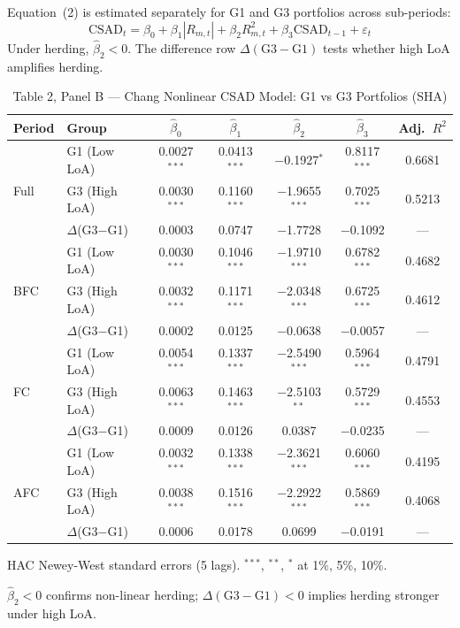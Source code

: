 \documentclass[12pt, a4paper]{article}
\newcommand{\CSAD}{\mathrm{CSAD}}
\begin{document}
Equation~(2) is estimated separately for G1 and G3 portfolios across sub-periods:
\begin{equation}
  \CSAD_t = \beta_0 + \beta_1 |R_{m,t}| + \beta_2 R_{m,t}^2 + \beta_3 \CSAD_{t-1} + \varepsilon_t
\end{equation}
Under herding, $\hat\beta_2 < 0$. The difference row $\Delta(\text{G3}-\text{G1})$ tests whether high LoA amplifies herding.

\begin{table}[H]
  \centering
  \caption{Table 2, Panel B — Chang Nonlinear CSAD Model: G1 vs G3 Portfolios (SHA)}
  \label{tab:chang_panel_b}
  \begin{threeparttable}
  \small
  \begin{tabular}{llccccc}
    \toprule
    Period & Group & $\hat\beta_0$ & $\hat\beta_1$ & $\hat\beta_2$ & $\hat\beta_3$ & Adj.~$R^2$ \\
    \midrule
    \multirow{3}{*}{Full}
      & G1 (Low LoA)  & 0.0027$^{***}$ &  0.0413$^{***}$ & $-$0.1927$^{*}$   & 0.8117$^{***}$ & 0.6681 \\
      & G3 (High LoA) & 0.0030$^{***}$ &  0.1160$^{***}$ & $-$1.9655$^{***}$ & 0.7025$^{***}$ & 0.5213 \\
      & $\Delta$(G3$-$G1) & 0.0003 & 0.0747 & $-$1.7728 & $-$0.1092 & --- \\
    \midrule
    \multirow{3}{*}{BFC}
      & G1 (Low LoA)  & 0.0030$^{***}$ &  0.1046$^{***}$ & $-$1.9710$^{***}$ & 0.6782$^{***}$ & 0.4682 \\
      & G3 (High LoA) & 0.0032$^{***}$ &  0.1171$^{***}$ & $-$2.0348$^{***}$ & 0.6725$^{***}$ & 0.4612 \\
      & $\Delta$(G3$-$G1) & 0.0002 & 0.0125 & $-$0.0638 & $-$0.0057 & --- \\
    \midrule
    \multirow{3}{*}{FC}
      & G1 (Low LoA)  & 0.0054$^{***}$ &  0.1337$^{***}$ & $-$2.5490$^{***}$ & 0.5964$^{***}$ & 0.4791 \\
      & G3 (High LoA) & 0.0063$^{***}$ &  0.1463$^{***}$ & $-$2.5103$^{**}$  & 0.5729$^{***}$ & 0.4553 \\
      & $\Delta$(G3$-$G1) & 0.0009 & 0.0126 &  0.0387 & $-$0.0235 & --- \\
    \midrule
    \multirow{3}{*}{AFC}
      & G1 (Low LoA)  & 0.0032$^{***}$ &  0.1338$^{***}$ & $-$2.3621$^{***}$ & 0.6060$^{***}$ & 0.4195 \\
      & G3 (High LoA) & 0.0038$^{***}$ &  0.1516$^{***}$ & $-$2.2922$^{***}$ & 0.5869$^{***}$ & 0.4068 \\
      & $\Delta$(G3$-$G1) & 0.0006 & 0.0178 &  0.0699 & $-$0.0191 & --- \\
    \bottomrule
  \end{tabular}
  \begin{tablenotes}
    \footnotesize
    \item HAC Newey-West standard errors (5 lags). $^{***}$, $^{**}$, $^{*}$ at 1\%, 5\%, 10\%.
    \item $\hat\beta_2 < 0$ confirms non-linear herding; $\Delta(\text{G3}-\text{G1}) < 0$ implies herding stronger under high LoA.
  \end{tablenotes}
  \end{threeparttable}
\end{table}
\end{document}
